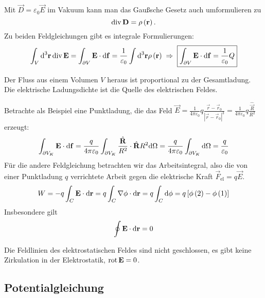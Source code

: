 Mit $\vec {D}=\varepsilon _{0}\vec {E}$ im Vakuum kann man das Gaußsche Gesetz auch umformulieren zu
\begin{equation}
	\label{3.6}
	\operatorname{div} \mathbf{D}=\rho \left(\mathbf{r}\right).
\end{equation}
Zu beiden Feldgleichungen gibt es integrale Formulierungen:
\begin{equation*}
	\int _{V}\text{d} ^{3}\mathbf{r}\operatorname{div} \mathbf{E}=\int _{\partial V}\mathbf{E}\cdot \text{d} \mathbf{f}=\frac{1}{\varepsilon _{0}}\int \text{d} ^{3}\mathbf{r}\rho \left(\mathbf{r}\right)\;\Rightarrow\; \boxed{\int _{\partial V}\mathbf{E}\cdot \text{d} \mathbf{f}=\frac{1}{\varepsilon _{0}}Q}
\end{equation*}
\begin{formal}
    Der Fluss aus einem Volumen $V$ heraus ist proportional zu der Gesamtladung. Die elektrische Ladungsdichte ist die Quelle des elektrischen Feldes. 
\end{formal}
Betrachte als Beispiel eine Punktladung, die das Feld $\vec {E}=\frac{1}{4\pi \varepsilon _{0}}q\frac{\vec {r}-\vec {r}_{0}}{\left| \vec {r}-\vec {r}_{0}\right| ^{3}}=\frac{1}{4\pi \varepsilon _{0}}q\frac{\hat{\vec {R}}}{R^{2}}$ erzeugt:
\begin{equation*}
	\int _{\partial V_{K}}\mathbf{E}\cdot \text{d} \mathbf{f}=\frac{q}{4\pi \varepsilon _{0}}\int _{\partial V_{K}}\frac{\hat{\mathbf{R}}}{R^{2}}\cdot \hat{\mathbf{R}}R^{2}\text{d} \Omega  =\frac{q}{4\pi \varepsilon _{0}}\int _{\partial V_{K}}\text{d} \Omega  =\frac{q}{\varepsilon _{0}}
\end{equation*}
Für die andere Feldgleichung betrachten wir das Arbeitsintegral, also die von einer Punktladung $q$ verrichtete Arbeit gegen die elektrische Kraft $\vec F_{\mathrm{el}}=q\vec {E}$.
\begin{equation*}
	W=-q\int _{C}\mathbf{E}\cdot \text{d} \mathbf{r}=q\int _{C}\nabla \phi \cdot \text{d} \mathbf{r}=q\int _{C}\text{d} \phi =q\left[\phi \left(2\right)-\phi \left(1\right)\right]
\end{equation*}
Insbesondere gilt
\begin{equation}
	\label{3.7}
	\oint \mathbf{E}\cdot \text{d} \mathbf{r}=0
\end{equation}

\begin{formal}
	Die Feldlinien des elektrostatischen Feldes sind nicht geschlossen, es gibt keine Zirkulation in der Elektrostatik, $\operatorname{rot} \mathbf{E}=0$.
\end{formal}



\subsection{Potentialgleichung}

